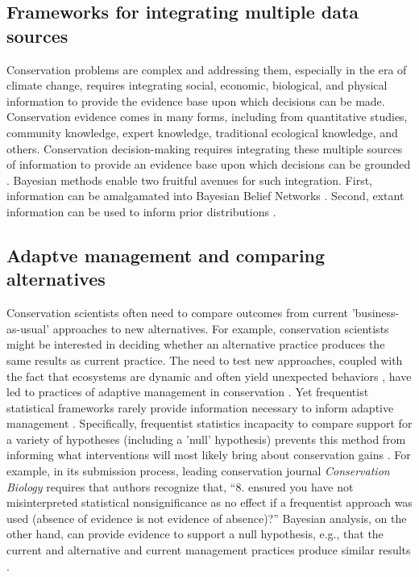 \documentclass{article}
\begin{document}
\subsection*{Frameworks for integrating multiple data sources}
\par Conservation problems are complex and addressing them, especially in the era of climate change, requires integrating social, economic, biological, and physical information to provide the evidence base upon which decisions can be made. Conservation evidence comes in many forms, including from quantitative studies, community knowledge, expert knowledge, traditional ecological knowledge, and others. Conservation decision-making requires integrating these multiple sources of information to provide an evidence base upon which decisions can be grounded \citep{stern2022interweaving}. Bayesian methods enable two fruitful avenues for such integration. First, information can be amalgamated into Bayesian Belief Networks \citep{marcot2001using,newton2007bayesian}. Second, extant information can be used to inform prior distributions \citep{o2008informed}. 

\subsection*{Adaptve management and comparing alternatives}
\par Conservation scientists often need to compare outcomes from current 'business-as-usual' approaches to new alternatives. For example, conservation scientists might be interested in deciding whether an alternative practice produces the same results as current practice. 
The need to test new approaches, coupled with the fact that ecosystems are dynamic and often yield unexpected behaviors \citep{Levin2012,Gross2013}, have led to practices of adaptive management in conservation \citep{holling1978adaptive}. Yet frequentist statistical frameworks rarely provide information necessary to inform adaptive management  \citep{prato2005bayesian}.  Specifically, frequentist statistics incapacity to compare support for a variety of hypotheses (including a 'null' hypothesis) prevents this method from informing what interventions will most likely bring about conservation gains \citep{prato2005bayesian}. For example, in its submission process, leading conservation journal \textit{Conservation Biology} requires that authors recognize that, ``8. ensured you have not misinterpreted statistical nonsignificance as no effect if a frequentist approach was used (absence of evidence is not evidence of absence)?'' Bayesian analysis, on the other hand, can provide evidence to support a null hypothesis, e.g., that the current and alternative and current management practices produce similar results \citep{gallistel2009importance}.
\end{document}
